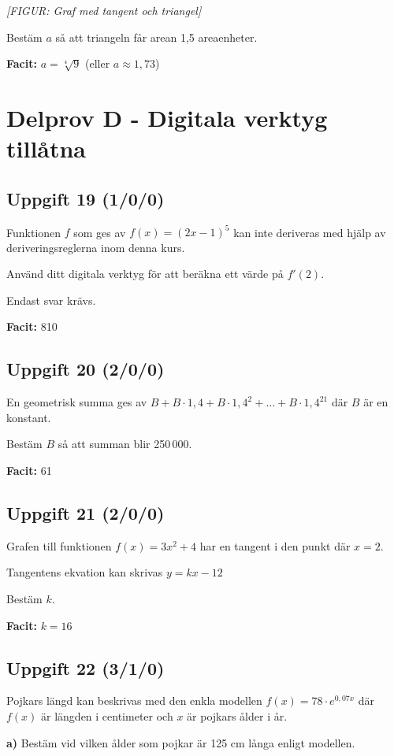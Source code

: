 \documentclass{article}
\begin{document}
\textit{[FIGUR: Graf med tangent och triangel]}

Bestäm $a$ så att triangeln får arean 1,5 areaenheter.

\textbf{Facit:} $a = \sqrt[4]{9}$ (eller $a \approx 1,73$)

\newpage

\section{Delprov D - Digitala verktyg tillåtna}

\subsection*{Uppgift 19 (1/0/0)}
Funktionen $f$ som ges av $f(x) = (2x - 1)^5$ kan inte deriveras med hjälp av deriveringsreglerna inom denna kurs.

Använd ditt digitala verktyg för att beräkna ett värde på $f'(2)$.

Endast svar krävs.

\textbf{Facit:} 810

\subsection*{Uppgift 20 (2/0/0)}
En geometrisk summa ges av $B + B \cdot 1,4 + B \cdot 1,4^2 + \ldots + B \cdot 1,4^{21}$ där $B$ är en konstant.

Bestäm $B$ så att summan blir 250\,000.

\textbf{Facit:} 61

\subsection*{Uppgift 21 (2/0/0)}
Grafen till funktionen $f(x) = 3x^2 + 4$ har en tangent i den punkt där $x = 2$.

Tangentens ekvation kan skrivas $y = kx - 12$

Bestäm $k$.

\textbf{Facit:} $k = 16$

\subsection*{Uppgift 22 (3/1/0)}
Pojkars längd kan beskrivas med den enkla modellen $f(x) = 78 \cdot e^{0,07x}$ där $f(x)$ är längden i centimeter och $x$ är pojkars ålder i år.

\textbf{a)} Bestäm vid vilken ålder som pojkar är 125 cm långa enligt modellen.
\end{document}
